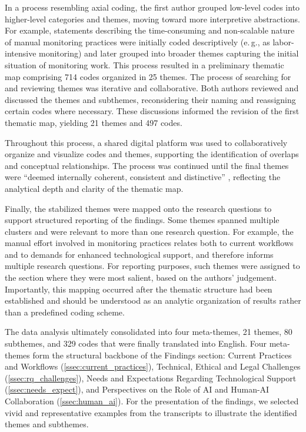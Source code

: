 \documentclass[acmsmall]{acmart}
\begin{document}
In a process resembling axial coding, the first author grouped low-level codes into higher-level categories and themes, moving toward more interpretive abstractions. For example, statements describing the time-consuming and non-scalable nature of manual monitoring practices were initially coded descriptively (e.\,g., as labor-intensive monitoring) and later grouped into broader themes capturing the initial situation of monitoring work. 
This process resulted in a preliminary thematic map comprising 714 codes organized in 25 themes.
The process of searching for and reviewing themes was iterative and collaborative. Both authors reviewed and discussed the themes and subthemes, reconsidering their naming and reassigning certain codes where necessary. These discussions informed the revision of the first thematic map, yielding 21 themes and 497 codes.

Throughout this process, a shared digital platform was used to collaboratively organize and visualize codes and themes, supporting the identification of overlaps and conceptual relationships. The process was continued until the final themes were ``deemed internally coherent, consistent and distinctive'' \cite{braun_using_2006}, reflecting the analytical depth and clarity of the thematic map.

Finally, the stabilized themes were mapped onto the research questions to support structured reporting of the findings. Some themes spanned multiple clusters and were relevant to more than one research question. For example, the manual effort involved in monitoring practices relates both to current workflows and to demands for enhanced technological support, and therefore informs multiple research questions. For reporting purposes, such themes were assigned to the section where they were most salient, based on the authors' judgement.  Importantly, this mapping occurred after the thematic structure had been established and should be understood as an analytic organization of results rather than a predefined coding scheme. 

The data analysis ultimately consolidated into four meta-themes, 21 themes, 80 subthemes, and 329 codes that were finally translated into English. Four meta-themes form the structural backbone of the Findings section: Current Practices and Workflows (\ref{ssec:current_practices}), Technical, Ethical and Legal Challenges (\ref{ssec:rq_challenges}), Needs and Expectations Regarding Technological Support (\ref{ssec:needs_expect}), and Perspectives on the Role of AI and Human-AI Collaboration (\ref{ssec:human_ai}).
For the presentation of the findings, we selected vivid and representative examples from the transcripts to illustrate the identified themes and subthemes. 
\end{document}
